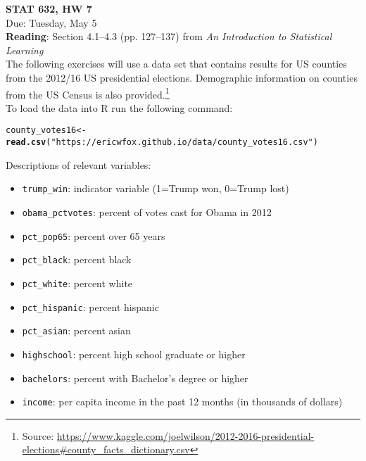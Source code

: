 \documentclass[11pt]{article}\usepackage[]{graphicx}\usepackage[]{color}
\makeatletter
\newcommand{\hlstr}[1]{\textcolor[rgb]{0.192,0.494,0.8}{#1}}%
\newcommand{\hlstd}[1]{\textcolor[rgb]{0.345,0.345,0.345}{#1}}%
\newcommand{\hlkwb}[1]{\textcolor[rgb]{0.69,0.353,0.396}{#1}}%
\newcommand{\hlkwd}[1]{\textcolor[rgb]{0.737,0.353,0.396}{\textbf{#1}}}%
\newenvironment{kframe}{%
 \def\at@end@of@kframe{}%
 \ifinner\ifhmode%
  \def\at@end@of@kframe{\end{minipage}}%
  \begin{minipage}{\columnwidth}%
 \fi\fi%
 \def\FrameCommand##1{\hskip\@totalleftmargin \hskip-\fboxsep
 \colorbox{shadecolor}{##1}\hskip-\fboxsep
     \hskip-\linewidth \hskip-\@totalleftmargin \hskip\columnwidth}%
 \MakeFramed {\advance\hsize-\width
   \@totalleftmargin\z@ \linewidth\hsize
   \@setminipage}}%
 {\par\unskip\endMakeFramed%
 \at@end@of@kframe}
\newenvironment{knitrout}{}{} %
\newenvironment{myitemize}
{ \begin{itemize}
    \setlength{\itemsep}{5pt}
    \setlength{\parskip}{0pt}
    \setlength{\parsep}{0pt}     }
{ \end{itemize}                  }
\makeatother
\begin{document}
\setlength\parindent{0pt}

\textbf{STAT 632, HW 7}\\
Due: Tuesday, May 5\\

\textbf{Reading}: Section 4.1--4.3 (pp. 127--137) from \emph{An Introduction to Statistical Learning}\\

The following exercises will use a data set that contains results for US counties from the 2012/16 US presidential elections.  Demographic information on counties from the US Census is also provided.\footnote{Source: \scriptsize \url{https://www.kaggle.com/joelwilson/2012-2016-presidential-elections\#county\_facts\_dictionary.csv}}\\

To load the data into R run the following command:
\begin{knitrout}
\color{fgcolor}\begin{kframe}
\begin{alltt}
\hlstd{county_votes16} \hlkwb{<-} \hlkwd{read.csv}\hlstd{(}\hlstr{"https://ericwfox.github.io/data/county_votes16.csv"}\hlstd{)}
\end{alltt}
\end{kframe}
\end{knitrout}

Descriptions of relevant variables:
\begin{myitemize}
\item \texttt{trump\_win}: indicator variable (1=Trump won, 0=Trump lost) 
\item \texttt{obama\_pctvotes}: percent of votes cast for Obama in 2012
\item \texttt{pct\_pop65}: percent over 65 years
\item \texttt{pct\_black}: percent black
\item \texttt{pct\_white}: percent white
\item \texttt{pct\_hispanic}: percent hispanic
\item \texttt{pct\_asian}: percent asian
\item \texttt{highschool}: percent high school graduate or higher
\item \texttt{bachelors}: percent with Bachelor's degree or higher
\item \texttt{income}: per capita income in the past 12 months (in thousands of dollars)\\
\end{myitemize}
\end{document}
